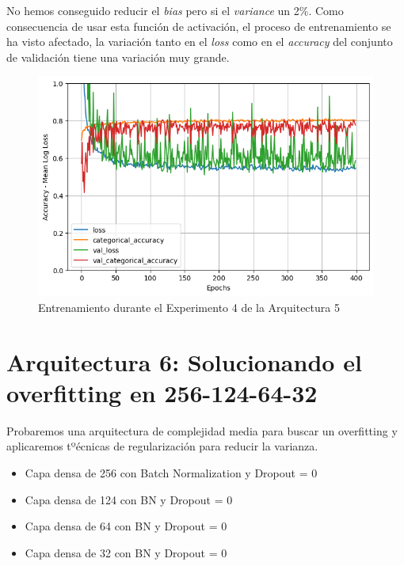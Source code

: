 \documentclass{article}
\begin{document}
		    No hemos conseguido reducir el \textit{bias} pero si el \textit{variance} un 2\%. Como consecuencia de usar esta funci\'on de activaci\'on, el proceso de entrenamiento se ha visto afectado, la variaci\'on tanto en el \textit{loss} como en el \textit{accuracy} del conjunto de validaci\'on tiene una variaci\'on muy grande.
			\begin{figure}[!h]
				\begin{center}
					\includegraphics[scale=0.5]{d-tr-a5-e4.png}		
					\caption{Entrenamiento durante el Experimento 4 de la Arquitectura 5}	
					\label{d-tr-a5-e4}
				\end{center}
			\end{figure}
		
		
		
		
		
    
    \section{Arquitectura 6: Solucionando el overfitting en 256-124-64-32}
    \label{b-s-a6}
			Probaremos una arquitectura de complejidad media para buscar un overfitting y aplicaremos tº\'ecnicas de regularizaci\'on para reducir la varianza. 
			\begin{itemize}
			    \item Capa densa de 256 con Batch Normalization y Dropout = 0
                \item Capa densa de 124 con BN y Dropout = 0
                \item Capa densa de 64 con BN y Dropout = 0
                \item Capa densa de 32 con BN y Dropout = 0
			\end{itemize}
\end{document}

